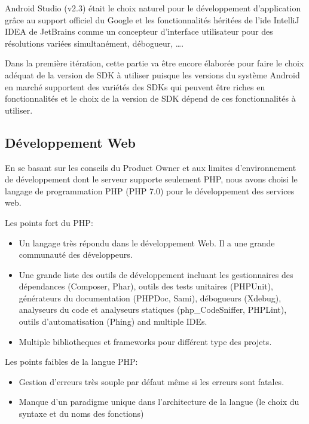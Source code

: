 Android Studio (v2.3) était le choix naturel pour le développement
d'application grâce au support officiel du Google et les fonctionnalités
héritées de l'ide IntelliJ IDEA de JetBrains comme un concepteur d'interface
utilisateur pour des résolutions variées simultanément, débogueur, \ldots.

Dans la première itération, cette partie va être encore élaborée pour faire le
choix adéquat de la version de SDK à utiliser puisque les versions du système
Android en marché supportent des variétés des SDKs qui peuvent être riches en
fonctionnalités et le choix de la version de SDK dépend de ces fonctionnalités
à utiliser.

\subsection{Développement Web}

En se basant sur les conseils du Product Owner et aux limites d'environnement
de développement dont le serveur supporte seulement PHP, nous avons choisi le
langage de programmation PHP (PHP 7.0) pour le développement des services web.

Les points fort du PHP:

\begin{itemize}
    \item Un langage très répondu dans le développement Web. Il a une
        grande communauté des développeurs.
    \item Une grande liste des outils de développement incluant les
        gestionnaires des dépendances (Composer, Phar), outils des tests
        unitaires (PHPUnit), générateurs du documentation (PHPDoc, Sami),
        débogueurs (Xdebug), analyseurs du code et analyseurs statiques
        (php\_CodeSniffer, PHPLint), outils d'automatisation (Phing) and
        multiple IDEs.
    \item Multiple bibliotheques et frameworks pour différent type des projets.
\end{itemize}

Les points faibles de la langue PHP:

\begin{itemize}
    \item Gestion d'erreurs très souple par défaut même si les erreurs sont
        fatales.
    \item Manque d'un paradigme unique dans l'architecture de la langue (le
        choix du syntaxe et du noms des fonctions)
\end{itemize}

